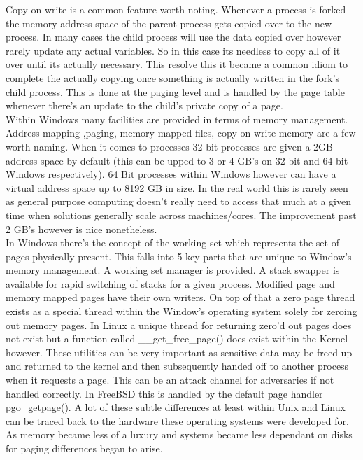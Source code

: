 \documentclass[letterpaper,10pt,draftclsnofoot,onecolumn]{IEEEtran}
\begin{document}
Copy on write is a common feature worth noting. Whenever a process is forked the memory address space of the parent process gets copied over to the new process. In many cases the child process will use the data copied over however rarely update any actual variables. So in this case its needless to copy all of it over until its actually necessary. This resolve this it became a common idiom to complete the actually copying once something is actually written in the fork’s child process. This is done at the paging level and is handled by the page table whenever there’s an update to the child’s private copy of a page. \cite{love} \\

Within Windows many facilities are provided in terms of memory management. Address mapping ,paging, memory mapped files, copy on write memory are a few worth naming. When it comes to processes 32 bit processes are given a 2GB address space by default (this can be upped to 3 or 4 GB’s on 32 bit and 64 bit Windows respectively). 64 Bit processes within Windows however can have a virtual address space up to 8192 GB in size. In the real world this is rarely seen as general purpose computing doesn’t really need to access that much at a given time when solutions generally scale across machines/cores. The improvement past 2 GB’s however is nice nonetheless. \\

In Windows there's the concept of the working set which represents the set of pages physically present. This falls into 5 key parts that are unique to Window’s memory management. A working set manager is provided. A stack swapper is available for rapid switching of stacks for a given process. Modified page and memory mapped pages have their own writers. On top of that a zero page thread exists as a special thread within the Window’s operating system solely for zeroing out memory pages. In Linux a unique thread for returning zero’d out pages does not exist but a function called __get_free_page() does exist within the Kernel however. \cite{love} These utilities can be very important as sensitive data may be freed up and returned to the kernel and then subsequently handed off to another process when it requests a page. This can be an attack channel for adversaries if not handled correctly. In FreeBSD this is handled by the default page handler pgo_getpage(). \cite{mccusick} A lot of these subtle differences at least within Unix and Linux can be traced back to the hardware these operating systems were developed for. As memory became less of a luxury and systems became less dependant on disks for paging differences began to arise. \\
\end{document}
